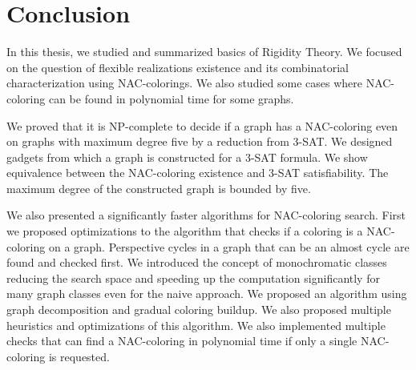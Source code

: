 
\chapter*{Conclusion}



In this thesis,
we studied and summarized basics of Rigidity Theory.
We focused on the question of flexible realizations existence
and its combinatorial characterization using NAC-colorings.
We also studied some cases where NAC-coloring can be found in polynomial time
for some graphs.

We proved that it is NP-complete
to decide if a graph has a NAC-coloring even on graphs with maximum degree five
by a reduction from 3-SAT\@.
We designed gadgets from which a graph is constructed for a 3-SAT formula.
We show equivalence between the NAC-coloring existence and 3-SAT satisfiability.
The maximum degree of the constructed graph is bounded by five.

We also presented a significantly faster algorithms
for NAC-coloring search.
%
First we proposed optimizations to the algorithm
that checks if a coloring is a NAC-coloring on a graph.
Perspective cycles in a graph that can be an almost cycle
are found and checked first.
%
We introduced the concept of monochromatic classes reducing the search space
and speeding up the computation significantly for many graph classes
even for the naive approach.
%
We proposed an algorithm using graph decomposition and gradual coloring buildup.
We also proposed multiple heuristics and optimizations of this algorithm.
%
We also implemented multiple checks that can find a NAC-coloring in polynomial time
if only a single NAC-coloring is requested.

